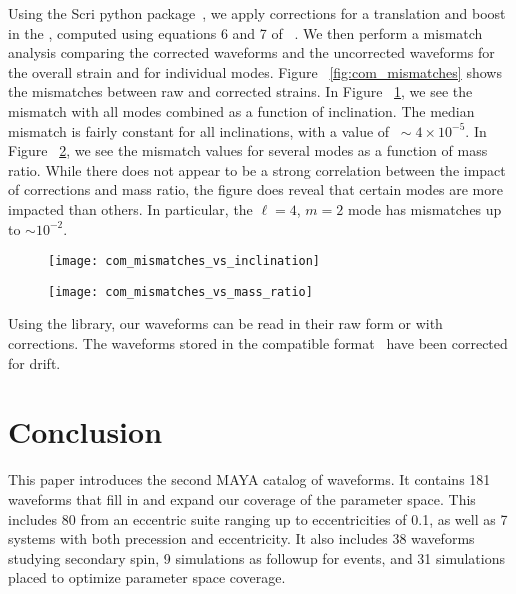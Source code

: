 \documentclass[
twocolumn,prd,
showpacs,
nofootinbib,
amsmath,amssymb,
superscriptaddress]{revtex4-1}
\begin{document}
Using the Scri python package~\cite{mike_boyle_2020_4041972, Boyle2013, BoyleEtAl:2014,Boyle2015a}, we apply corrections for a translation and boost in the \com{}, computed using equations 6 and 7 of ~\cite{Woodford:2019tlo}.
We then perform a mismatch analysis comparing the \com{} corrected waveforms and the uncorrected waveforms for the overall strain and for individual modes.
Figure ~\ref{fig:com_mismatches} shows the mismatches between raw and \com{} corrected strains.
In Figure ~\ref{fig:com_mismatches_vs_inclination}, we see the mismatch with all modes combined as a function of inclination. 
The median mismatch is fairly constant for all inclinations, with a value of $~\sim 4 \times 10^{-5}$.
In Figure ~\ref{fig:com_mismatches_vs_mass_ratio}, we see the mismatch values for several modes as a function of mass ratio.
While there does not appear to be a strong correlation between the impact of \com{} corrections and mass ratio, the figure does reveal that certain modes are more impacted than others.
In particular,  the $\ell = 4$, $m = 2$ mode has mismatches up to $\sim 10^{-2}$.

\begin{figure*}
\centering
\begin{subfigure}[t]{.48\textwidth}
    \centering
   \texttt{[image: com\_mismatches\_vs\_inclination]}
    \caption{}
    \label{fig:com_mismatches_vs_inclination}
\end{subfigure}
\begin{subfigure}[t]{.48\textwidth}
    \centering
    \texttt{[image: com\_mismatches\_vs\_mass\_ratio]}
 	\caption{}
 	\label{fig:com_mismatches_vs_mass_ratio}
\end{subfigure}
\caption{Mismatches between \com{} drift corrected waveforms and raw waveforms. a) The mismatch including all modes vs inclination. Each system is represented by a light gray line with the darker line showing the median value.  b) The mismatch for various modes and for all modes (at face-on orientation) as a funciton of mass ratio. } 
\label{fig:com_mismatches}
\end{figure*}

Using the \mayawaves{} library, our waveforms can be read in their raw form or with \com{} corrections. 
The waveforms stored in the \pycbc{} compatible format~\cite{lalsuite, alex_nitz_2020_3630601, Schmidt:2017btt} have been corrected for \com{} drift.


\section{Conclusion}\label{sec:conclusion}
This paper introduces the second MAYA catalog of \nr{} waveforms. 
It contains 181 waveforms that fill in and expand our coverage of the \bbh{} parameter space.
This includes 80 from an eccentric suite ranging up to eccentricities of 0.1, as well as 7 systems with both precession and eccentricity.
It also includes 38 waveforms studying secondary spin, 9 simulations as \nr{} followup for \lvk{} events, and 31 simulations placed to optimize parameter space coverage.
\end{document}
